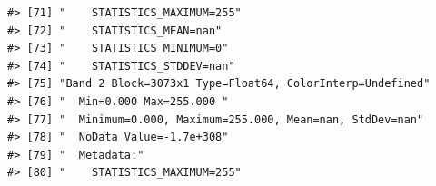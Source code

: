 \documentclass[
]{book}
\begin{document}
\begin{verbatim}
#> [71] "    STATISTICS_MAXIMUM=255"                                                                                                                                                                                                                                                     
#> [72] "    STATISTICS_MEAN=nan"                                                                                                                                                                                                                                                        
#> [73] "    STATISTICS_MINIMUM=0"                                                                                                                                                                                                                                                       
#> [74] "    STATISTICS_STDDEV=nan"                                                                                                                                                                                                                                                      
#> [75] "Band 2 Block=3073x1 Type=Float64, ColorInterp=Undefined"                                                                                                                                                                                                                        
#> [76] "  Min=0.000 Max=255.000 "                                                                                                                                                                                                                                                       
#> [77] "  Minimum=0.000, Maximum=255.000, Mean=nan, StdDev=nan"                                                                                                                                                                                                                         
#> [78] "  NoData Value=-1.7e+308"                                                                                                                                                                                                                                                       
#> [79] "  Metadata:"                                                                                                                                                                                                                                                                    
#> [80] "    STATISTICS_MAXIMUM=255"                                                                                                                                                                                                                                                     

\end{verbatim}
\end{document}
